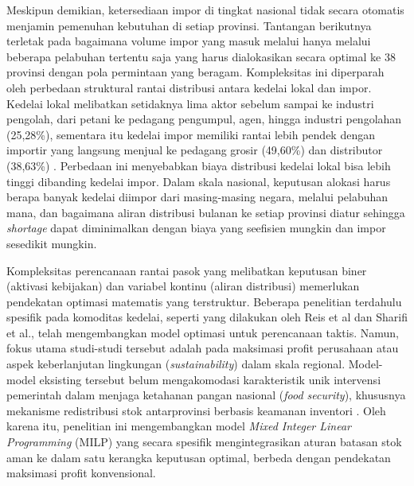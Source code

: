 \documentclass{file/TA-ITS}
\theoremstyle{definition}
\theoremstyle{definition}
\theoremstyle{plain}
\begin{document}
Meskipun demikian, ketersediaan impor di tingkat nasional tidak secara otomatis menjamin pemenuhan kebutuhan di setiap provinsi. Tantangan berikutnya terletak pada bagaimana volume impor yang masuk melalui hanya melalui beberapa pelabuhan tertentu saja yang harus dialokasikan secara optimal ke 38 provinsi dengan pola permintaan yang beragam. Kompleksitas ini diperparah oleh perbedaan struktural rantai distribusi antara kedelai lokal dan impor. Kedelai lokal melibatkan setidaknya lima aktor sebelum sampai ke industri pengolah, dari petani ke pedagang pengumpul, agen, hingga industri pengolahan (25,28\%), sementara itu kedelai impor memiliki rantai lebih pendek dengan importir yang langsung menjual ke pedagang grosir (49,60\%) dan distributor (38,63\%) \cite{cips2023logistics}. Perbedaan ini menyebabkan biaya distribusi kedelai lokal bisa lebih tinggi dibanding kedelai impor. Dalam skala nasional, keputusan alokasi harus berapa banyak kedelai diimpor dari masing-masing negara, melalui pelabuhan mana, dan bagaimana aliran distribusi bulanan ke setiap provinsi diatur sehingga \textit{shortage} dapat diminimalkan dengan biaya yang seefisien mungkin dan impor sesedikit mungkin.

Kompleksitas perencanaan rantai pasok yang melibatkan keputusan biner (aktivasi kebijakan) dan variabel kontinu (aliran distribusi) memerlukan pendekatan optimasi matematis yang terstruktur. Beberapa penelitian terdahulu spesifik pada komoditas kedelai, seperti yang dilakukan oleh Reis et al dan Sharifi et al., telah mengembangkan model optimasi untuk perencanaan taktis. Namun, fokus utama studi-studi tersebut adalah pada maksimasi profit perusahaan atau aspek keberlanjutan lingkungan (\textit{sustainability}) dalam skala regional. Model-model eksisting tersebut belum mengakomodasi karakteristik unik intervensi pemerintah dalam menjaga ketahanan pangan nasional (\textit{food security}), khususnya mekanisme redistribusi stok antarprovinsi berbasis keamanan inventori \cite{reis2023, SHARIFI2023}. Oleh karena itu, penelitian ini mengembangkan model \textit{Mixed Integer Linear Programming} (MILP) yang secara spesifik mengintegrasikan aturan batasan stok aman ke dalam satu kerangka keputusan optimal, berbeda dengan pendekatan maksimasi profit konvensional.
\end{document}
